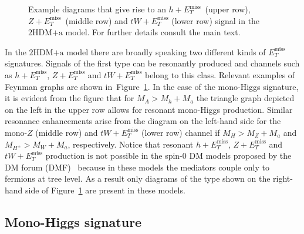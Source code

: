 \documentclass[a4paper, 11pt,notoc]{article}
\newcommand{\MET}{\ensuremath{E_T^\mathrm{miss}}\xspace}
\newcommand{\hdma}{\ensuremath{\textrm{2HDM+a}}\xspace}
\begin{document}
\begin{figure}[t!]
\vspace{4mm}
\caption{\label{fig:resonant} Example diagrams that give rise to an $h+\MET$~(upper row), $Z+\MET$~(middle row) and $tW + \MET$ (lower row) signal in the \hdma model. For further details consult the main text. }
\end{figure}

In the   \hdma model there are broadly speaking two different kinds of $\MET$ signatures. Signals of the first type can be resonantly produced and  channels such as $h+\MET$, $Z+ \MET$ and $tW+\MET$ belong to this class. Relevant examples of Feynman graphs are shown in~Figure~\ref{fig:resonant}. In the case of the mono-Higgs signature, it is evident from the figure that for $M_A > M_h + M_a$ the triangle  graph depicted on the left in the upper row  allows for resonant mono-Higgs production.  Similar resonance enhancements arise from the diagram on the left-hand side for the mono-$Z$ (middle row) and $tW+\MET$ (lower row) channel if $M_H > M_Z + M_a$ and $M_{H^\pm} > M_W + M_a$, respectively. Notice that resonant $h+\MET$, $Z+\MET$ and $tW+\MET$ production is not possible in the spin-0  DM models proposed by the DM forum (DMF)~\cite{Abercrombie:2015wmb} because in these models the mediators couple only to fermions at tree level. As a result only diagrams of the type shown on the right-hand side of Figure~\ref{fig:resonant} are present in  these models. 

\subsection*{Mono-Higgs signature}
\end{document}

